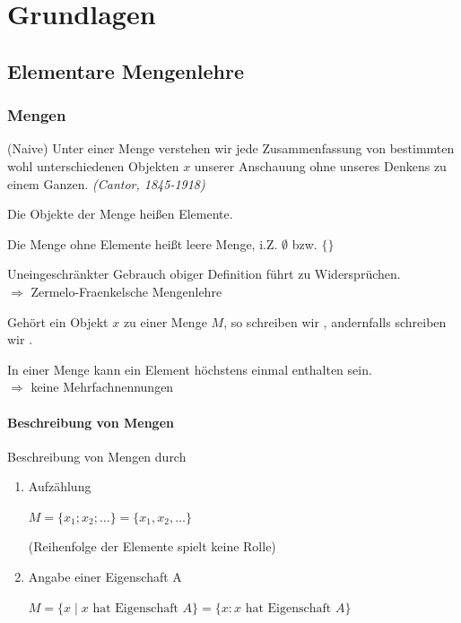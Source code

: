 \part{Grundlagen}

\chapter{Elementare Mengenlehre}

\section{Mengen}

\Def(Naive)
Unter einer Menge verstehen wir jede Zusammenfassung von bestimmten wohl unterschiedenen Objekten $x$ unserer Anschauung ohne unseres Denkens zu einem Ganzen. \emph{(Cantor, 1845-1918)}

Die Objekte der Menge heißen Elemente.

Die Menge ohne Elemente heißt leere Menge, i.Z. $\emptyset$ bzw. $\{\}$

\Beachte
Uneingeschränkter Gebrauch obiger Definition führt zu Widersprüchen.\\
$\Rightarrow$ Zermelo-Fraenkelsche Mengenlehre

\Def Gehört ein Objekt $x$ zu einer Menge $M$, so schreiben wir , andernfalls schreiben wir .

\Bem In einer Menge kann ein Element höchstens einmal enthalten sein.\\
$\Rightarrow$ keine Mehrfachnennungen

\subsection{Beschreibung von Mengen}

Beschreibung von Mengen durch
\begin{enumerate}
	\item Aufzählung
	
	$M=\{x_1;x_2;\ldots\}=\{x_1,x_2,\ldots\}$
	
	(Reihenfolge der Elemente spielt keine Rolle)
	
	\item Angabe einer Eigenschaft A
	
	$M=\{x\mid x\text{ hat Eigenschaft }A\} = \{x:x\text{ hat Eigenschaft }A\}$
\end{enumerate}

\Bsps

